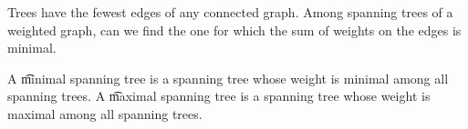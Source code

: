 

Trees have the fewest edges of any connected graph.
Among spanning trees of a weighted graph, can we find the one for which the sum of weights on the edges is minimal.


A \t{minimal spanning tree} is a spanning tree whose weight is minimal among all spanning trees.
A \t{maximal spanning tree} is a spanning tree whose weight is maximal among all spanning trees.
